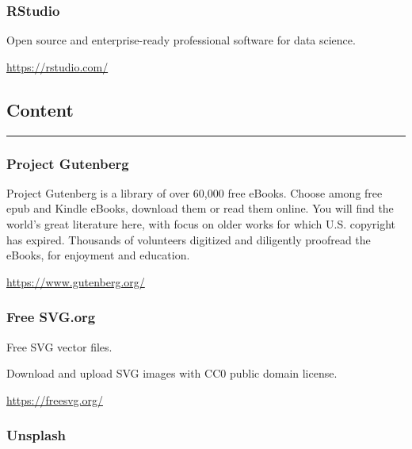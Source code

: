\documentclass[
]{book}
\theoremstyle{definition}
\theoremstyle{definition}
\theoremstyle{definition}
\theoremstyle{definition}
\theoremstyle{remark}
\begin{document}
\hypertarget{rstudio}{%
\subsubsection*{RStudio}\label{rstudio}}

Open source and enterprise-ready professional software for data science.

\url{https://rstudio.com/}

\hypertarget{content}{%
\subsection*{Content}\label{content}}

\begin{center}\rule{0.5\linewidth}{0.5pt}\end{center}

\hypertarget{project-gutenberg}{%
\subsubsection*{Project Gutenberg}\label{project-gutenberg}}

Project Gutenberg is a library of over 60,000 free eBooks. Choose among free epub and Kindle eBooks, download them or read them online. You will find the world's great literature here, with focus on older works for which U.S. copyright has expired. Thousands of volunteers digitized and diligently proofread the eBooks, for enjoyment and education.

\url{https://www.gutenberg.org/}

\hypertarget{free-svg.org}{%
\subsubsection*{Free SVG.org}\label{free-svg.org}}

Free SVG vector files.

Download and upload SVG images with CC0 public domain license.

\url{https://freesvg.org/}

\hypertarget{unsplash}{%
\subsubsection*{Unsplash}\label{unsplash}}
\end{document}
